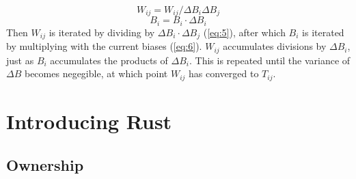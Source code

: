 \newpage
\begin{equation}\label{eq:5}
    W_{ij} = W_{ij} / \Delta B_i \Delta B_j
\end{equation}
\begin{equation}\label{eq:6}
    B_i = B_i \cdot \Delta B_i
\end{equation}
Then $W_{ij}$ is iterated by dividing by $\Delta B_i \cdot \Delta B_j$
(\eqref{eq:5}), after which $B_i$ is iterated by multiplying with the current
biases (\eqref{eq:6}). $W_{ij}$ accumulates divisions by $\Delta B_i$, just as
$B_i$ accumulates the products of $\Delta B_i$. This is repeated until the
variance of $\Delta B$ becomes negegible, at which point $W_{ij}$ has converged
to $T_{ij}$.






\section{Introducing Rust}\label{sec:Rust}



\subsection{Ownership}


